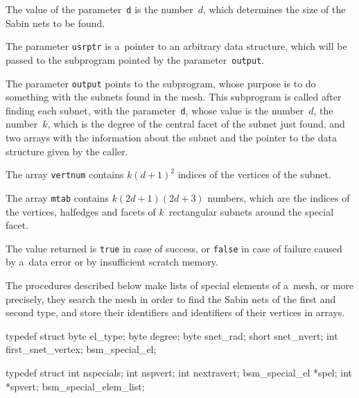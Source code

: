 The value of the parameter~\texttt{d} is the number~$d$, which determines
the size of the Sabin nets to be found.

The parameter \texttt{usrptr} is a~pointer to an arbitrary data structure,
which will be passed to the subprogram pointed by the
parameter~\texttt{output}.

The parameter \texttt{output} points to the subprogram, whose purpose is to
do something with the subnets found in the mesh. This subprogram is called
after finding each subnet, with the parameter~\texttt{d}, whose value is the
number~$d$, the number~$k$, which is the degree of the central facet of the
subnet just found, and two arrays with the information about the subnet and
the pointer to the data structure given by the caller.

The array \texttt{vertnum} contains $k(d+1)^2$ indices of the vertices of
the subnet.

The array \texttt{mtab} contains $k(2d+1)(2d+3)$ numbers, which are the indices
of the vertices, halfedges and facets of $k$~rectangular subnets around the
special facet.

The value returned is \texttt{true} in case of success, or \texttt{false} in
case of failure caused by a~data error or by insufficient scratch memory.


\bigskip
The procedures described below make lists of special elements of a~mesh,
or more precisely, they search the mesh in order to find the Sabin nets of
the first and second type, and store their identifiers and identifiers of
their vertices in arrays.

\medskip
\begin{listingC}
typedef struct {
    byte  el_type;
    byte  degree;
    byte  snet_rad;
    short snet_nvert;
    int   first_snet_vertex;
  } bsm_special_el;

typedef struct {
    int            nspecials;
    int            nspvert;
    int            nextravert;
    bsm_special_el *spel;
    int            *spvert;
  } bsm_special_elem_list;
\end{listingC}

